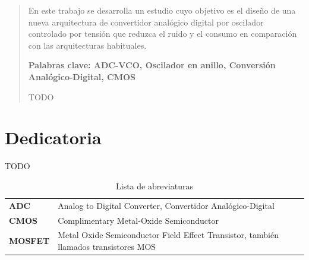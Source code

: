 \documentclass[12pt]{report} %
\begin{document}
\newpage %
\thispagestyle{empty}
\mbox{}

\renewcommand\abstractname{\large\bfseries\filcenter\uppercase{Resumen}}
\begin{abstract}
\thispagestyle{plain}
\setcounter{page}{3}
	
	En este trabajo se desarrolla un estudio cuyo objetivo es el diseño de una nueva arquitectura de convertidor analógico digital por oscilador controlado por tensión que reduzca el ruido y el consumo en comparación con las arquitecturas habituales.
	
	\textbf{Palabras clave: ADC-VCO, Oscilador en anillo, Conversión Analógico-Digital, CMOS}
	
	TODO
	\vfill
\end{abstract}
	\newpage %
	\thispagestyle{empty}
	\mbox{}


\chapter*{Dedicatoria}

\setcounter{page}{5}
	
	TODO
		
	\vfill
	
	\newpage %
	\thispagestyle{empty}
	\mbox{}
	


\tableofcontents
\thispagestyle{fancy}


\listoffigures
\thispagestyle{fancy}


\listoftables
\thispagestyle{fancy}


\newpage
\begin{table}[h!]
	\setlength{\arrayrulewidth}{0mm}
	\begin{center}
		\caption{Lista de abreviaturas}
		\label{tab:table1}
		\begin{tabular}{>{\bf}p{4cm}|p{10cm}}
			ADC & Analog to Digital Converter, Convertidor Analógico-Digital \\
			CMOS & Complimentary Metal-Oxide Semiconductor \\
			MOSFET & Metal Oxide Semiconductor Field Effect Transistor, también llamados transistores MOS \\
		\end{tabular}
	\end{center}
\end{table}
\end{document}
